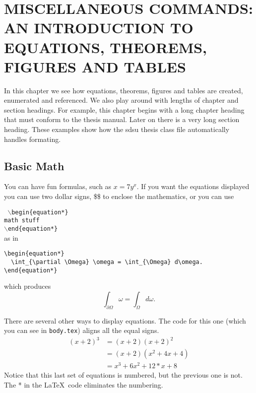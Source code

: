 \chapter{MISCELLANEOUS COMMANDS: AN INTRODUCTION TO EQUATIONS,
  THEOREMS, FIGURES AND TABLES}

In this chapter we see how equations, theorems, figures and tables are
created, enumerated and referenced.  We also play around with lengths
of chapter and section headings.  For example, this chapter begins
with a long chapter heading that must conform to the thesis manual.
Later on there is a very long section heading.  These examples show
how the sdsu thesis class file automatically handles formating.



\section{Basic Math}

You can have fun formulas, such as $x= 7 y^x$.  If you want the
equations displayed you can use two dollar signs, \$\$ to enclose the
mathematics, or you can use

\medskip\noindent
\texttt{%
  \hspace*{2em}$\backslash$begin\{equation*\} \\
  \hspace*{3em}math stuff \\
  \hspace*{2em}$\backslash$end\{equation*\}
}\\%
as in

\medskip\noindent\hspace*{2em}\begin{minipage}{4.5in}
\begin{verbatim}
\begin{equation*}
  \int_{\partial \Omega} \omega = \int_{\Omega} d\omega.
\end{equation*}
\end{verbatim}
\end{minipage}

\medskip\noindent
which produces
\begin{equation*}
  \int_{\partial \Omega} \omega = \int_{\Omega} d\omega.
\end{equation*}

There are several other ways to display equations.  The code for this
one (which you can see in \verb+body.tex+) aligns all the equal
signs.
\begin{align}
  (x+2)^3 & = (x+2)(x+2)^2 \\
  &= (x+2)(x^2+4x+ 4) \\
  &= x^3+ 6x^2 + 12*x + 8
\end{align}
Notice that this last set of equations is numbered, but the previous
one is not.  The * in the \LaTeX\ code eliminates the numbering.


